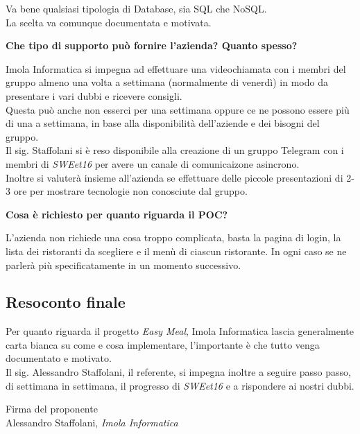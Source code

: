 \documentclass[a4paper, 11pt]{article}
\begin{document}
Va bene qualsiasi tipologia di Database, sia SQL che NoSQL.\\
La scelta va comunque documentata e motivata.\newline

\textbf{Che tipo di supporto può fornire l'azienda? Quanto spesso?}

Imola Informatica si impegna ad effettuare una videochiamata con i membri del gruppo almeno una volta a settimana (normalmente di venerdì) in modo da presentare i vari dubbi e ricevere consigli. \\
Questa può anche non esserci per una settimana oppure ce ne possono essere più di una a settimana, in base alla disponibilità dell'aziende e dei bisogni del gruppo. \\
Il sig. Staffolani si è reso disponibile alla creazione di un gruppo Telegram con i membri di \textit{SWEet16} per avere un canale di comunicaizone asincrono. \\
Inoltre si valuterà insieme all'azienda se effettuare delle piccole presentazioni di 2-3 ore per mostrare tecnologie non conosciute dal gruppo. \newline

\textbf{Cosa è richiesto per quanto riguarda il POC?}

L'azienda non richiede una cosa troppo complicata, basta la pagina di login, la lista dei ristoranti da scegliere e il menù di ciascun ristorante.
In ogni caso se ne parlerà più specificatamente in un momento successivo.\newline

\subsection{Resoconto finale}

Per quanto riguarda il progetto \textit{Easy Meal}, Imola Informatica lascia generalmente carta bianca su come e cosa implementare, l'importante è che tutto venga documentato e motivato. \\
Il sig. Alessandro Staffolani, il referente, si impegna inoltre a seguire passo passo, di settimana in settimana, il progresso di \textit{SWEet16} e a rispondere ai nostri dubbi.

\vspace{200pt}
\begin{flushleft}
\hfill Firma del proponente \\
\vspace{50pt}
\hfill Alessandro Staffolani, \textit{Imola Informatica}
\end{flushleft}
\end{document}
